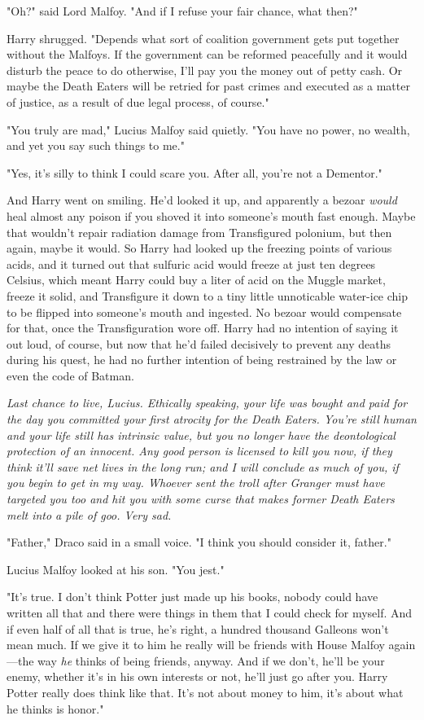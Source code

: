 "Oh?" said Lord Malfoy. "And if I refuse your fair chance, what then?"

Harry shrugged. "Depends what sort of coalition government gets put together
without the Malfoys. If the government can be reformed peacefully and it would
disturb the peace to do otherwise, I'll pay you the money out of petty cash. Or
maybe the Death Eaters will be retried for past crimes and executed as a matter
of justice, as a result of due legal process, of course."

"You truly are mad," Lucius Malfoy said quietly. "You have no power, no wealth,
and yet you say such things to me."

"Yes, it's silly to think I could scare you. After all, you're not a Dementor."

And Harry went on smiling. He'd looked it up, and apparently a bezoar
\emph{would} heal almost any poison if you shoved it into someone's mouth fast
enough. Maybe that wouldn't repair radiation damage from Transfigured polonium,
but then again, maybe it would. So Harry had looked up the freezing points of
various acids, and it turned out that sulfuric acid would freeze at just ten
degrees Celsius, which meant Harry could buy a liter of acid on the Muggle
market, freeze it solid, and Transfigure it down to a tiny little unnoticable
water-ice chip to be flipped into someone's mouth and ingested. No bezoar would
compensate for that, once the Transfiguration wore off. Harry had no intention
of saying it out loud, of course, but now that he'd failed decisively to
prevent any deaths during his quest, he had no further intention of being
restrained by the law or even the code of Batman.

\emph{Last chance to live, Lucius. Ethically speaking, your life was bought and
paid for the day you committed your first atrocity for the Death Eaters. You're
still human and your life still has intrinsic value, but you no longer have the
deontological protection of an innocent. Any good person is licensed to kill
you now, if they think it'll save net lives in the long run; and I will
conclude as much of you, if you begin to get in my way. Whoever sent the troll
after Granger must have targeted you too and hit you with some curse that makes
former Death Eaters melt into a pile of goo. Very sad.}

"Father," Draco said in a small voice. "I think you should consider it, father."

Lucius Malfoy looked at his son. "You jest."

"It's true. I don't think Potter just made up his books, nobody could have
written all that and there were things in them that I could check for myself.
And if even half of all that is true, he's right, a hundred thousand Galleons
won't mean much. If we give it to him he really will be friends with House
Malfoy again—the way \emph{he} thinks of being friends, anyway. And if we
don't, he'll be your enemy, whether it's in his own interests or not, he'll
just go after you. Harry Potter really does think like that. It's not about
money to him, it's about what he thinks is honor."

